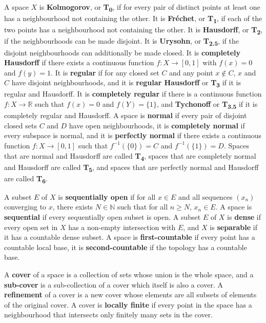 \documentclass[12pt]{article}
\newcommand{\tS}[1]{\textsubscript{#1}}
\newcommand{\R}{\mathbb{R}}
\newcommand{\N}{\mathbb{N}}
\begin{document}
A space $X$ is \textbf{Kolmogorov}, or \textbf{T\tS{0}}, if for every pair of distinct points at least one has a neighbourhood not containing the other. It is \textbf{Fr\'{e}chet}, or \textbf{T\tS{1}}, if each of the two points has a neighbourhood not containing the other. It is \textbf{Hausdorff}, or \textbf{T\tS{2}}, if the neighbourhoods can be made disjoint. It is \textbf{Urysohn}, or \textbf{T\tS{2.5}}, if the disjoint neighbourhoods can additionally be made closed. It is \textbf{completely Hausdorff} if there exists a continuous function $f: X \rightarrow [0,1]$ with $f(x) = 0$ and $f(y) = 1$. It is \textbf{regular} if for any closed set $C$ and any point $x \notin C$, $x$ and $C$ have disjoint neighbourhoods, and it is \textbf{regular Hausdorff} or \textbf{T\tS{3}} if it is regular and Hausdorff. It is \textbf{completely regular} if there is a continuous function $f: X \rightarrow \R$ such that $f(x) = 0$ and $f(Y) = \{1\}$, and \textbf{Tychonoff} or \textbf{T\tS{3.5}} if it is completely regular and Hausdorff. A space is \textbf{normal} if every pair of disjoint closed sets $C$ and $D$ have open neighbourhoods, it is \textbf{completely normal} if every subspace is normal, and it is \textbf{perfectly normal} if there exists a continuous function $f: X \rightarrow [0,1]$ such that $f^{-1}(\{0\}) = C$ and $f^{-1}(\{1\}) = D$. Spaces that are normal and Hausdorff are called \textbf{T\tS{4}}, spaces that are completely normal and Hausdorff are called \textbf{T\tS{5}}, and spaces that are perfectly normal and Hausdorff are called \textbf{T\tS{6}}.

A subset $E$ of $X$ is \textbf{sequentially open} if for all $x \in E$ and all sequences $(x_n)$ converging to $x$, there exists $N \in \N$ such that for all $n \geq N$, $x_n \in E$. A space is \textbf{sequential} if every sequentially open subset is open. A subset $E$ of $X$ is \textbf{dense} if every open set in $X$ has a non-empty intersection with $E$, and $X$ is \textbf{separable} if it has a countable dense subset. A space is \textbf{first-countable} if every point has a countable local base, it is \textbf{second-countable} if the topology has a countable base.

A \textbf{cover} of a space is a collection of sets whose union is the whole space, and a \textbf{sub-cover} is a sub-collection of a cover which itself is also a cover. A \textbf{refinement} of a cover is a new cover whose elements are all subsets of elements of the original cover. A cover is \textbf{locally finite} if every point in the space has a neighbourhood that intersects only finitely many sets in the cover.
\end{document}
